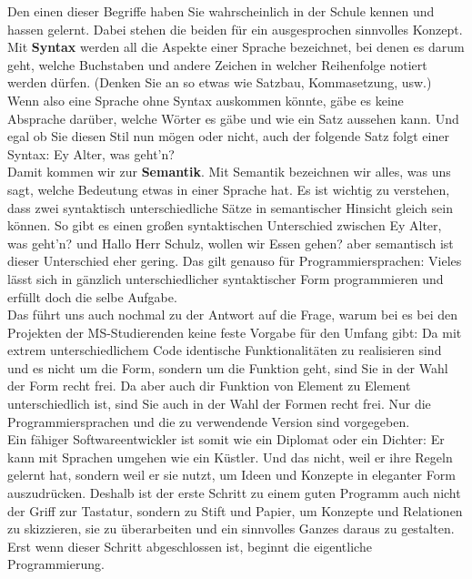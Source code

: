 Den einen dieser Begriffe haben Sie wahrscheinlich in der Schule kennen und hassen gelernt. Dabei stehen die beiden für ein ausgesprochen sinnvolles Konzept. Mit \textbf{Syntax} werden all die Aspekte einer Sprache bezeichnet, bei denen es darum geht, welche Buchstaben und andere Zeichen in welcher Reihenfolge notiert werden dürfen. (Denken Sie an so etwas wie Satzbau, Kommasetzung, usw.) Wenn also eine Sprache ohne Syntax auskommen könnte, gäbe es keine Absprache darüber, welche Wörter es gäbe und wie ein Satz aussehen kann. Und egal ob Sie diesen Stil nun mögen oder nicht, auch der folgende Satz folgt einer Syntax: \glqq{}Ey Alter, was geht’n?\grqq{}\\

Damit kommen wir zur \textbf{Semantik}. Mit Semantik bezeichnen wir alles, was uns sagt, welche Bedeutung etwas in einer Sprache hat. Es ist wichtig zu verstehen, dass zwei syntaktisch unterschiedliche Sätze in semantischer Hinsicht gleich sein können. So gibt es einen großen syntaktischen Unterschied zwischen \glqq{}Ey Alter, was geht’n?\grqq{} und \glqq{}Hallo Herr Schulz, wollen wir Essen gehen?\grqq{} aber semantisch ist dieser Unterschied eher gering. Das gilt genauso für Programmiersprachen: Vieles lässt sich in gänzlich unterschiedlicher syntaktischer Form programmieren und erfüllt doch die selbe Aufgabe.\\

Das führt uns auch nochmal zu der Antwort auf die Frage, warum bei es bei den Projekten der MS-Studierenden keine feste Vorgabe für den Umfang gibt: Da mit extrem unterschiedlichem Code identische Funktionalitäten zu realisieren sind und es nicht um die Form, sondern um die Funktion geht, sind Sie in der Wahl der Form recht frei. Da aber auch dir Funktion von Element zu Element unterschiedlich ist, sind Sie auch in der Wahl der Formen recht frei. Nur die Programmiersprachen und die zu verwendende Version sind vorgegeben.\\

Ein fähiger Softwareentwickler ist somit wie ein Diplomat oder ein Dichter: Er kann mit Sprachen umgehen wie ein Küstler. Und das nicht, weil er ihre Regeln gelernt hat, sondern weil er sie nutzt, um Ideen und Konzepte in eleganter Form auszudrücken. Deshalb ist der erste Schritt zu einem guten Programm auch nicht der Griff zur Tastatur, sondern zu Stift und Papier, um Konzepte und Relationen zu skizzieren, sie zu überarbeiten und ein sinnvolles Ganzes daraus zu gestalten. Erst wenn dieser Schritt abgeschlossen ist, beginnt die eigentliche Programmierung.\\

